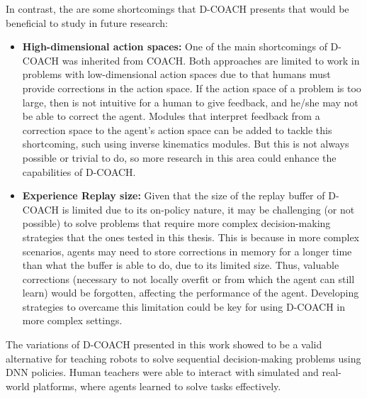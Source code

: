 In contrast, the are some shortcomings that D-COACH presents that would be beneficial to study in future research:
\begin{itemize}
    \item \textbf{High-dimensional action spaces:} One of the main shortcomings of D-COACH was inherited from COACH. Both approaches are limited to work in problems with low-dimensional action spaces due to that humans must provide corrections in the action space. If the action space of a problem is too large, then is not intuitive for a human to give feedback, and he/she may not be able to correct the agent. Modules that interpret feedback from a correction space to the agent's action space can be added to tackle this shortcoming, such using inverse kinematics modules. But this is not always possible or trivial to do, so more research in this area could  enhance the capabilities of D-COACH.
    \item \textbf{Experience Replay size:} Given that the size of the replay buffer of D-COACH is limited due to its on-policy nature, it may be challenging (or not possible) to solve problems that require more complex decision-making strategies that the ones tested in this thesis. This is because in more complex scenarios, agents may need to store corrections in memory for a longer time than what the buffer is able to do, due to its limited size. Thus, valuable corrections (necessary to not locally overfit or from which the agent can still learn) would be forgotten, affecting the performance of the agent. Developing strategies to overcame this limitation could be key for using D-COACH in more complex settings. 
\end{itemize}

The variations of D-COACH presented in this work showed to be a valid alternative for teaching robots to solve sequential decision-making problems using DNN policies. Human teachers were able to interact with simulated and real-world platforms, where agents learned to solve tasks effectively.